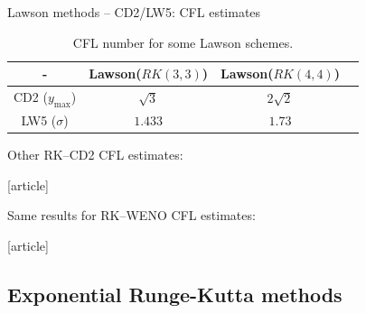 \documentclass{beamer}
\newcommand{\customcite}[1]{\cite{#1}}
\begin{document}
\begin{frame}{Lawson methods -- CD2/LW5: CFL estimates}
  \begin{table}
    \centering
    \begin{tabular}{|c|c|c|c|}
      \hline
      - & Lawson($RK(3,3)$) & Lawson($RK(4,4)$) \\
      \hline
      CD2 ($y_{\max}$) & $\sqrt{3}$ & $2\sqrt{2}$\\
      \hline
      LW5 ($\sigma$) & $1.433$   & $1.73$   \\
      \hline  
    \end{tabular}
    \caption{CFL number for some Lawson schemes.}
  \end{table}
  Other RK--CD2 CFL estimates:
\begin{thebibliography}{9}
  [article]
  \bibitem{} \customcite{Baldauf:2008}
\end{thebibliography}
  Same results for RK--WENO CFL estimates:
\begin{thebibliography}{9}
  [article]
  \bibitem{} \customcite{Motamed:2010}
  \bibitem{} \customcite{Lunet:2017}
\end{thebibliography}
\end{frame}

\subsection{Exponential Runge-Kutta methods}
\end{document}
